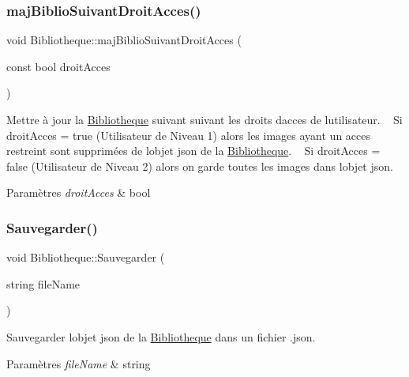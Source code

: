 \subsubsection{\texorpdfstring{maj\+Biblio\+Suivant\+Droit\+Acces()}{majBiblioSuivantDroitAcces()}}
{\footnotesize\ttfamily void Bibliotheque\+::maj\+Biblio\+Suivant\+Droit\+Acces (\begin{DoxyParamCaption}\item[{const bool}]{droit\+Acces }\end{DoxyParamCaption})}



Mettre à jour la \hyperlink{classBibliotheque}{Bibliotheque} suivant suivant les droits d\textquotesingle{}acces de l\textquotesingle{}utilisateur. ~\newline
 Si droit\+Acces = true (Utilisateur de Niveau 1) alors les images ayant un acces restreint sont supprimées de l\textquotesingle{}objet json de la \hyperlink{classBibliotheque}{Bibliotheque}. ~\newline
 Si droit\+Acces = false (Utilisateur de Niveau 2) alors on garde toutes les images dans l\textquotesingle{}objet json. 


\begin{DoxyParams}{Paramètres}
{\em droit\+Acces} & bool \\
\hline
\end{DoxyParams}
\mbox{\label{classBibliotheque_abaf79da5c656d7cccb14b3c3a4b542f6}} 
\subsubsection{\texorpdfstring{Sauvegarder()}{Sauvegarder()}}
{\footnotesize\ttfamily void Bibliotheque\+::\+Sauvegarder (\begin{DoxyParamCaption}\item[{string}]{file\+Name }\end{DoxyParamCaption})}



Sauvegarder l\textquotesingle{}objet json de la \hyperlink{classBibliotheque}{Bibliotheque} dans un fichier .json. 


\begin{DoxyParams}{Paramètres}
{\em file\+Name} & string \\
\hline
\end{DoxyParams}
\mbox{\label{classBibliotheque_a8dc396d28693e921f7fd849944356434}} 

